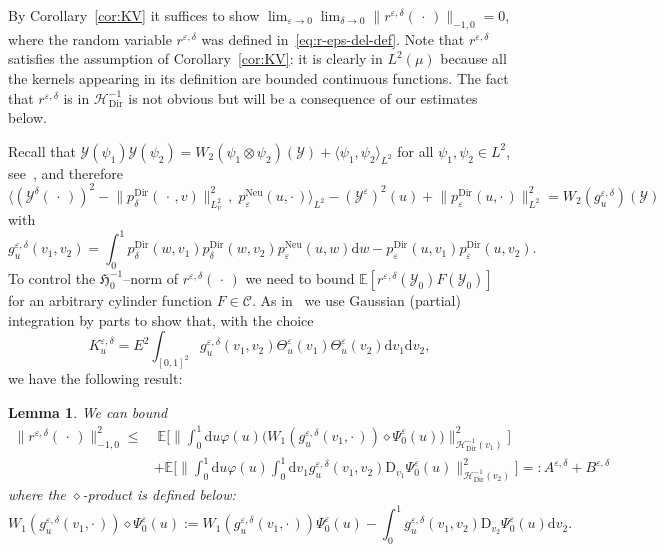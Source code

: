 \documentclass[10pt]{amsart}
\newtheorem{lemm}[theo]{Lemma}\newtheorem{prop}[theo]{Proposition}\newtheorem{coro}[theo]{Corollary}\newtheorem{conj}[theo]{Conjecture}
\theoremstyle{definition}\newtheorem{defi}[theo]{Definition}\newtheorem{rema}[theo]{Remark}\newtheorem{exam}[theo]{Example}\newtheorem{exem}[theo]{Example}\newtheorem{nota}[theo]{Notation}
\DeclareMathOperator{\Dir}{Dir}
\DeclareMathOperator{\Neu}{Neu}
\newcommand{\mc}[1]{{\mathcal #1}}
\renewcommand{\mc}[1]{{\mathcal #1}}
\newcommand{\mrD}{\mathrm{D}}
\renewcommand{\le}{\leqslant}
\newcommand*{\dd}{\mathrm{d}}
\newcommand*{\du}{\dd u}
\newcommand*{\dv}{\dd v}
\newcommand*{\dw}{\dd w}
\begin{document}
By Corollary~\ref{cor:KV} it suffices to show $\lim_{\varepsilon \rightarrow 0} \lim_{\delta \rightarrow 0} \| r^{\varepsilon, \delta} ({\,\cdot\,})\|_{- 1,0} = 0$, where the random variable $r^{\varepsilon, \delta}$ was defined in~\eqref{eq:r-eps-del-def}. Note that $r^{\varepsilon,\delta}$ satisfies the assumption of Corollary~\ref{cor:KV}: it is clearly in $L^2(\mu)$ because all the kernels appearing in its definition are bounded continuous functions. The fact that $r^{\varepsilon,\delta}$ is in $\mc H_{\Dir}^{- 1}$ is not obvious but will be a consequence of our estimates below.

Recall that $\mc Y(\psi_1) \mc Y(\psi_2) = W_2(\psi_1 \otimes \psi_2)(\mc Y) + \langle \psi_1, \psi_2\rangle_{L^2}$ for all $\psi_1, \psi_2 \in L^2$, see~\cite[Proposition~1.1.2]{Nualart2006}, and therefore
\[
\Big\langle (\mc Y^{\delta}({\,\cdot\,}))^2 -\big\|p^{\Dir}_{\delta} (\,\cdot\,, v)\big\|_{L^2_v}^2 \,,\; p^{\Neu}_{\varepsilon} (u, \cdot\,)\Big\rangle_{L^2} - (\mc Y^{\varepsilon})^2 (u) +\big\|p^{\Dir}_{\varepsilon} (u, \cdot\,) \big\|_{L^2}^2 = W_2 (g^{\varepsilon,\delta}_u) (\mc Y)
\]
with
\begin{equation}\label{eq:g-eps-delta-def}
g^{\varepsilon, \delta}_u (v_1, v_2) =\int_0^1 p^{\Dir}_{\delta} (w, v_1) p^{\Dir}_{\delta} (w, v_2) p^{\Neu}_{\varepsilon} (u, w) \dw - p^{\Dir}_{\varepsilon} (u, v_1) p^{\Dir}_{\varepsilon} (u, v_2).
\end{equation}
To control the $\mathfrak{H}_0^{- 1}$--norm of $r^{\varepsilon, \delta} ({\,\cdot\,})$ we need to bound $\mathbb{E} [r^{\varepsilon, \delta} (\mc Y_0) F (\mc Y_0)]$ for an arbitrary cylinder function $F \in \mathcal{C}$. As in~\cite[Lemma~4.4]{Gubinelli2015Energy} we use Gaussian (partial) integration by parts to show that, with the choice
\begin{equation}\label{eq:K-eps-delta-def}
K^{\varepsilon, \delta}_u = E^2
\int_{[0, 1]^2} g^{\varepsilon, \delta}_u (v_1, v_2) \Theta^{\varepsilon}_u (v_1) \Theta^{\varepsilon}_u (v_2) \dv_1 \dv_2,
\end{equation}
we have the following result:

\begin{lemm}\label{lem:r-eps-constants}
We can bound
\begin{align*}
\big\| r^{\varepsilon, \delta} ({\,\cdot\,}) \big\|_{- 1,0}^2 \le & \;
\mathbb{E} \bigg[\bigg\| \int_0^1 \du \varphi (u) \big(W_1 (g^{\varepsilon, \delta}_u (v_1, \cdot\,)) \diamond \Psi^{\varepsilon}_0 (u)\big) \bigg\|_{\mc H_{\Dir}^{- 1}(v_1)}^2 \bigg]\\
& + \mathbb{E} \bigg[\bigg\| \int_0^1 \du \varphi (u) \int_0^1 \dv_1 g^{\varepsilon, \delta}_u (v_1, v_2) \mathrm{D}_{v_1}
\Psi^{\varepsilon}_0 (u) \bigg\|_{\mc H_{\Dir}^{- 1}(v_2)}^2 \bigg] = : A^{\varepsilon, \delta} + B^{\varepsilon, \delta}
\end{align*}
where the $\diamond$-product is defined below:
\[
W_1 (g^{\varepsilon, \delta}_u (v_1, \cdot\,)) \diamond \Psi^{\varepsilon}_0 (u) := W_1 (g^{\varepsilon, \delta}_u (v_1,\cdot\,)) \Psi^{\varepsilon}_0 (u) - \int_0^1 g^{\varepsilon, \delta}_u (v_1, v_2) \mrD_{v_2} \Psi^{\varepsilon}_0 (u) \dv_2.
\]
\end{lemm}
\end{document}
